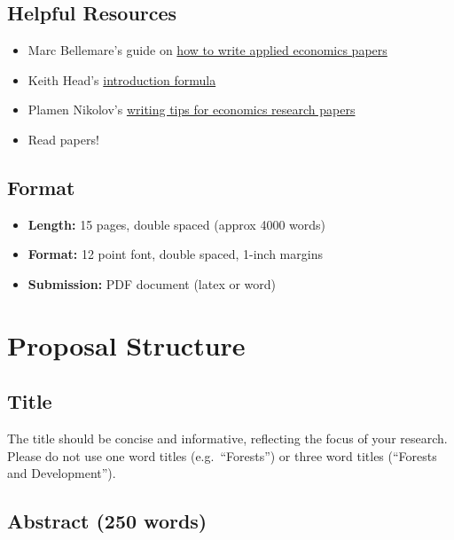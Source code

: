 \documentclass[
]{article}
\providecommand{\tightlist}{%
  \setlength{\itemsep}{0pt}\setlength{\parskip}{0pt}}
\begin{document}
\hypertarget{helpful-resources}{%
\subsection{Helpful Resources}\label{helpful-resources}}

\begin{itemize}
\tightlist
\item
  Marc Bellemare's guide on \href{https://marcfbellemare.com/wordpress/wp-content/uploads/2020/09/BellemareHowToPaperSeptember2020.pdf}{how to write applied economics papers}
\item
  Keith Head's \href{https://blogs.ubc.ca/khead/research/research-advice/formula}{introduction formula}
\item
  Plamen Nikolov's \href{https://docs.iza.org/dp15057.pdf}{writing tips for economics research papers}
\item
  Read papers!
\end{itemize}

\hypertarget{format}{%
\subsection{Format}\label{format}}

\begin{itemize}
\item
  \textbf{Length:} 15 pages, double spaced (approx 4000 words)
\item
  \textbf{Format:} 12 point font, double spaced, 1-inch margins
\item
  \textbf{Submission:} PDF document (latex or word)
\end{itemize}

\newpage

\hypertarget{proposal-structure}{%
\section{Proposal Structure}\label{proposal-structure}}

\hypertarget{title}{%
\subsection{Title}\label{title}}

The title should be concise and informative, reflecting the focus of your research. Please do not use one word titles (e.g.~``Forests'') or three word titles (``Forests and Development'').

\hypertarget{abstract-250-words}{%
\subsection{Abstract (250 words)}\label{abstract-250-words}}
\end{document}
